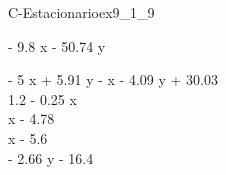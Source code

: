 
\begin{bilevelmodel}{C-Estacionario}{ex9_1_9}
    \begin{upperlevel}{- 9.8 x - 50.74 y}{
        
    }
    \end{upperlevel}
    \begin{lowerlevel}{- 5 x + 5.91 y}{
         - x - 4.09 y + 30.03  \\ 
 1.2 - 0.25 x  \\ 
 x - 4.78  \\ 
 x - 5.6  \\ 
 - 2.66 y - 16.4 
    }
    \end{lowerlevel}
\end{bilevelmodel}
    
        